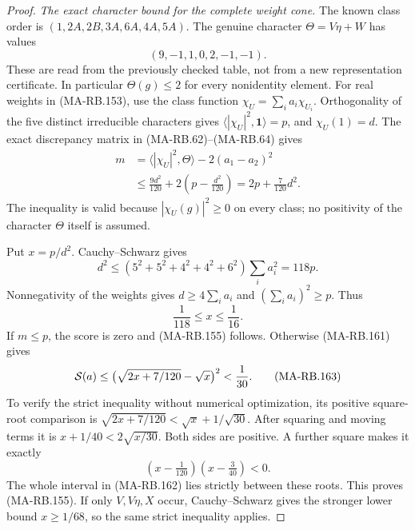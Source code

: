 \begin{proof}
\emph{The exact character bound for the complete weight cone.}
The known class order is
\((1,2A,2B,3A,6A,4A,5A)\).  The genuine character
\(\Theta=V\eta+W\) has values
\[
                   (9,-1,1,0,2,-1,-1).
 \tag{MA-RB.160}
\]
These are read from the previously checked table, not
from a new representation certificate.  In particular
\(\Theta(g)\le2\) for every nonidentity element.
For real weights in (MA-RB.153), use the class function
\(\chi_U=\sum_i a_i\chi_{U_i}\).
Orthogonality of the five distinct irreducible
characters gives
\(\langle|\chi_U|^2,\mathbf1\rangle=p\), and
\(\chi_U(1)=d\).
The exact discrepancy matrix in (MA-RB.62)--(MA-RB.64)
gives
\[
 \begin{split}
 m&=\langle|\chi_U|^2,\Theta\rangle
                                -2(a_1-a_2)^2\\
  &\le\frac{9d^2}{120}
                    +2\left(p-\frac{d^2}{120}\right)
   =2p+\frac7{120}d^2 .
 \end{split}
 \tag{MA-RB.161}
\]
The inequality is valid because \(|\chi_U(g)|^2\ge0\)
on every class; no positivity of the character
\(\Theta\) itself is assumed.

Put \(x=p/d^2\).  Cauchy--Schwarz gives
\[
 d^2\le
  (5^2+5^2+4^2+4^2+6^2)\sum_i a_i^2=118p.
\]
Nonnegativity of the weights gives
\(d\ge4\sum_i a_i\) and
\((\sum_i a_i)^2\ge p\).  Thus
\[
                         \frac1{118}\le x\le\frac1{16}.
 \tag{MA-RB.162}
\]
If \(m\le p\), the score is zero and (MA-RB.155)
follows.  Otherwise (MA-RB.161) gives
\[
 {\cal S}(a)
   \le\bigl(\sqrt{2x+7/120}-\sqrt x\bigr)^2
                     <\frac1{30}.
 \tag{MA-RB.163}
\]
To verify the strict inequality without numerical
optimization, its positive square-root comparison is
\(\sqrt{2x+7/120}<\sqrt x+1/\sqrt{30}\).
After squaring and moving terms it is
\(x+1/40<2\sqrt{x/30}\).  Both sides are positive.
A further square makes it exactly
\[
                 (x-\tfrac1{120})(x-\tfrac3{40})<0.
\]
The whole interval in (MA-RB.162) lies strictly between
these roots.  This proves (MA-RB.155).
If only \(V,V\eta,X\) occur, Cauchy--Schwarz gives the
stronger lower bound \(x\ge1/68\), so the same strict
inequality applies.
\end{proof}

